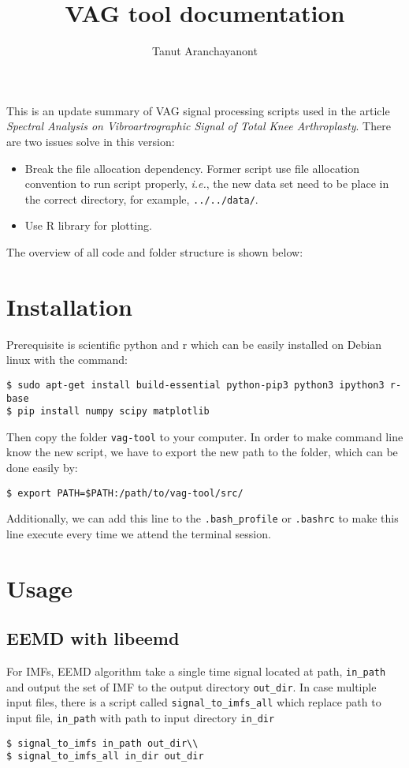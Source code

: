 \documentclass{article}
\author{Tanut Aranchayanont}
\title{VAG tool documentation}
\begin{document}
\maketitle

This is an update summary of VAG signal processing scripts used in the article \emph{Spectral Analysis on Vibroartrographic Signal of Total Knee Arthroplasty}. There are two issues solve in this version:
\begin{itemize}
  \item Break the file allocation dependency. Former script use file allocation convention to run script properly, \emph{i.e.}, the new data set need to be place in the correct directory, for example, \texttt{../../data/}.
  \item Use R library for plotting.
\end{itemize}
The overview of all code and folder structure is shown below:


\section*{Installation}
Prerequisite is scientific python and r which can be easily installed on Debian linux with the command:
\begin{verbatim}
$ sudo apt-get install build-essential python-pip3 python3 ipython3 r-base
$ pip install numpy scipy matplotlib
\end{verbatim}
Then copy the folder \texttt{vag-tool} to your computer. In order to make command line know the new script, we have to export the new path to the folder, which can be done easily by:
\begin{verbatim}
$ export PATH=$PATH:/path/to/vag-tool/src/
\end{verbatim}
Additionally, we can add this line to the \texttt{.bash\_profile} or \texttt{.bashrc} to make this line execute every time we attend the terminal session.

\section*{Usage}
\subsection*{EEMD with libeemd}
For IMFs, EEMD algorithm take a single time signal located at path, \texttt{in\_path} and output the set of IMF to the output directory \texttt{out\_dir}. In case multiple input files, there is a script called \texttt{signal\_to\_imfs\_all} which replace path to input file, \texttt{in\_path} with path to input directory \texttt{in\_dir}
\begin{verbatim}
$ signal_to_imfs in_path out_dir\\
$ signal_to_imfs_all in_dir out_dir
\end{verbatim}
\end{document}
